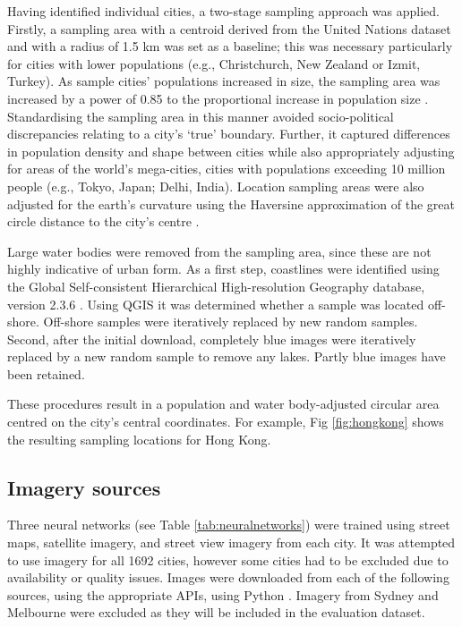 \documentclass[10pt,letterpaper,hidelinks]{article}
\begin{document}
Having identified individual cities, a two-stage sampling approach was applied. Firstly, a sampling area with a centroid derived from the United Nations dataset and with a radius of 1.5 km was set as a baseline; this was necessary particularly for cities with lower populations (e.g., Christchurch, New Zealand or Izmit, Turkey). As sample cities' populations increased in size, the sampling area was increased by a power of 0.85 to the proportional increase in population size \cite{Barthelemy2016}. Standardising the sampling area in this manner avoided socio-political discrepancies relating to a city's `true' boundary. Further, it captured differences in population density and shape between cities while also appropriately adjusting for areas of the world's mega-cities, cities with populations exceeding 10 million people (e.g., Tokyo, Japan;  Delhi, India). Location sampling areas were also adjusted for the earth's curvature using the Haversine approximation of the great circle distance to the city's centre \cite{Sinnott1984}. 

Large water bodies were removed from the sampling area, since these are not highly indicative of urban form. As a first step, coastlines were identified using the Global Self-consistent Hierarchical High-resolution Geography database, version 2.3.6 \cite{Wessel1996}. Using QGIS \cite{QGIS2009} it was determined whether a sample was located off-shore. Off-shore samples were iteratively replaced by new random samples. Second, after the initial download, completely blue images were iteratively replaced by a new random sample to remove any lakes. Partly blue images have been retained.

These procedures result in a population and water body-adjusted circular area centred on the city's central coordinates. For example, Fig \ref{fig:hongkong} shows the resulting sampling locations for Hong Kong.





\label{methodsimagery}
\subsection*{Imagery sources}

Three neural networks (see Table \ref{tab:neuralnetworks}) were trained using street maps, satellite imagery, and street view imagery from each city. It was attempted to use imagery for all 1692 cities, however some cities had to be excluded due to availability or quality issues. Images were downloaded from each of the following sources, using the appropriate APIs, using Python \cite{Python2016}. Imagery from Sydney and Melbourne were excluded as they will be included in the evaluation dataset. 
\end{document}
